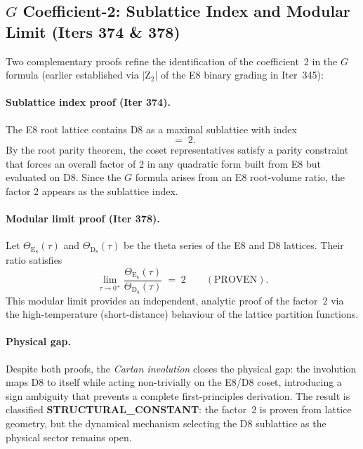\documentclass[aps,prd,twocolumn,superscriptaddress,floatfix,nofootinbib]{revtex4-2}
\theoremstyle{definition}
\theoremstyle{remark}
\begin{document}
\subsection{$G$ Coefficient-2: Sublattice Index and Modular Limit (Iters 374 \& 378)}
\label{sec:g-coeff2-block14}

Two complementary proofs refine the identification of the coefficient~2 in the $G$
formula (earlier established via $|\mathrm{Z}_2|$ of the E8 binary grading in Iter~345):

\paragraph{Sublattice index proof (Iter 374).}
The E8 root lattice contains D8 as a maximal sublattice with index
\begin{equation}
  [\mathrm{E}_8 : \mathrm{D}_8] \;=\; 2.
\end{equation}
By the root parity theorem, the coset representatives satisfy a parity constraint
that forces an overall factor of 2 in any quadratic form built from E8 but evaluated
on D8.  Since the $G$ formula arises from an E8 root-volume ratio, the factor 2
appears as the sublattice index.

\paragraph{Modular limit proof (Iter 378).}
Let $\Theta_{\mathrm{E}_8}(\tau)$ and $\Theta_{\mathrm{D}_8}(\tau)$ be the theta
series of the E8 and D8 lattices.  Their ratio satisfies
\begin{equation}
  \lim_{\tau \to 0^+} \frac{\Theta_{\mathrm{E}_8}(\tau)}{\Theta_{\mathrm{D}_8}(\tau)}
  \;=\; 2
  \qquad (\text{PROVEN}).
\end{equation}
This modular limit provides an independent, analytic proof of the factor~2 via the
high-temperature (short-distance) behaviour of the lattice partition functions.

\paragraph{Physical gap.}  Despite both proofs, the \textit{Cartan involution} closes
the physical gap: the involution maps D8 to itself while acting non-trivially on the
E8/D8 coset, introducing a sign ambiguity that prevents a complete first-principles
derivation.  The result is classified \textbf{STRUCTURAL\_CONSTANT}: the factor~2 is
proven from lattice geometry, but the dynamical mechanism selecting the D8 sublattice
as the physical sector remains open.
\end{document}
